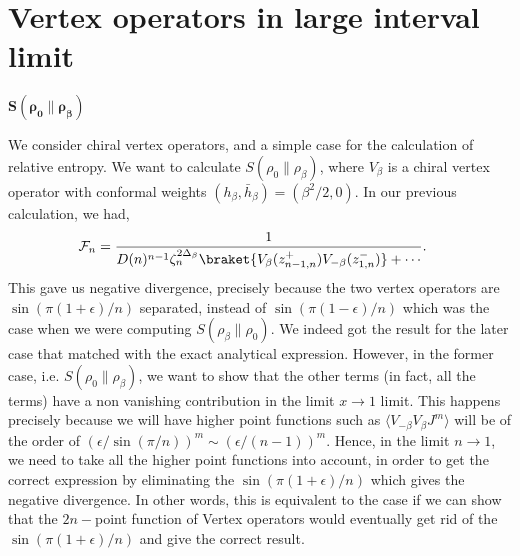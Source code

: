 \documentclass[11pt]{article}
\newcommand{\ep}{\epsilon}
\begin{document}
\section{Vertex operators in large interval limit}
$\boldsymbol{S(\rho_0 \| \rho_\beta)}$

We consider chiral vertex operators, and a simple case for the calculation of relative entropy. We want to calculate $S(\rho_0 \| \rho_\beta)$, where $V_\beta$ is a chiral vertex operator with conformal weights $(h_\beta , \bar h_\beta ) = (\beta^2/2,0)$. In our previous calculation, we had,
\begin{align}
    \mathcal{F}_n &= \frac{1}{D(n)^{n-1} \zeta_n^{2\Delta_\beta}\braket{V_{\beta}(z_{n-1,n}^+)V_{-\beta}(z_{1,n}^-)}+\cdots}. 
\end{align}
This gave us negative divergence, precisely because the two vertex operators are $\sin(\pi (1+\ep)/n)$ separated, instead of $\sin(\pi(1-\ep)/n)$ which was the case when we were computing $S(\rho_\beta\| \rho_0)$. We indeed got the result for the later case that matched with the exact analytical expression.
However, in the former case, i.e. $S(\rho_0 \| \rho_\beta)$, we want to show that the other terms (in fact, all the terms) have a non vanishing contribution in the limit $x\to 1$ limit. This happens precisely because we will have higher point functions such as $\langle V_{-\beta}V_\beta J^m\rangle$ will be of the order of $(\ep/ \sin(\pi/n) )^m \sim (\ep /(n-1))^m$. Hence, in the limit $n\to 1$, we need to take all the higher point functions into account, in order to get the correct expression by eliminating the $\sin (\pi(1+\ep)/n)$ which gives the negative divergence. 
In other words, this is equivalent to the case if we can show that the $2n-$point function of Vertex operators would eventually get rid of the $\sin (\pi(1+\ep)/n)$  and give the correct result. 
\end{document}
